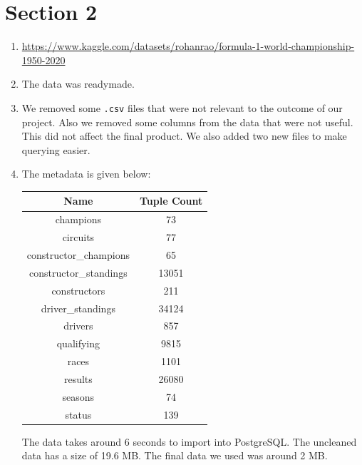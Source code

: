 \documentclass{article}
\begin{document}
\newpage
\section{Section 2}
\begin{enumerate}
	\item \url{https://www.kaggle.com/datasets/rohanrao/formula-1-world-championship-1950-2020}
	\item The data was readymade.
	\item We removed some \texttt{.csv} files that were not relevant to the outcome of our project. Also we removed some columns from the data that were not useful. This did not affect the final product. We also added two new files to make querying easier.
	\item The metadata is given below:
	
	\begin{tabular}{|c|c|}
		\hline
		\textbf{Name}&\textbf{Tuple Count}\\
		\hline
		\hline
		champions&73\\
		\hline
		circuits&77\\
		\hline
		constructor\_champions&65\\
		\hline
		constructor\_standings&13051\\
		\hline
		constructors&211\\
		\hline
		driver\_standings&34124\\
		\hline
		drivers&857\\
		\hline
		qualifying&9815\\
		\hline
		races&1101\\
		\hline
		results&26080\\
		\hline
		seasons&74\\
		\hline
		status&139\\
		\hline
	\end{tabular}

	The data takes around 6 seconds to import into PostgreSQL. The uncleaned data has a size of 19.6 MB. The final data we used was around 2 MB.
\end{enumerate}
\end{document}
